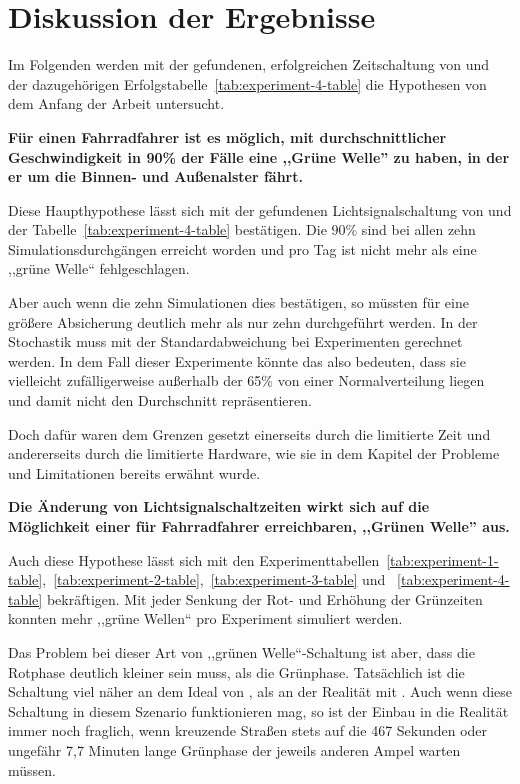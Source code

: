 %


\section{Diskussion der Ergebnisse}\label{sec:discussion-of-results}

Im Folgenden werden mit der gefundenen, erfolgreichen Zeitschaltung von  und der dazugehörigen Erfolgstabelle~\ref{tab:experiment-4-table} die Hypothesen von dem Anfang der Arbeit untersucht.

\textbf{Für einen Fahrradfahrer ist es möglich, mit durchschnittlicher Geschwindigkeit in 90\% der Fälle eine ,,Grüne Welle'' zu haben, in der er um die Binnen- und Außenalster fährt.}

Diese Haupthypothese lässt sich mit der gefundenen Lichtsignalschaltung von  und der Tabelle~\ref{tab:experiment-4-table} bestätigen.
Die 90\% sind bei allen zehn Simulationsdurchgängen erreicht worden und pro Tag ist nicht mehr als eine ,,grüne Welle`` fehlgeschlagen.

Aber auch wenn die zehn Simulationen dies bestätigen, so müssten für eine größere Absicherung deutlich mehr als nur zehn durchgeführt werden.
In der Stochastik muss mit der Standardabweichung bei Experimenten gerechnet werden.
In dem Fall dieser Experimente könnte das also bedeuten, dass sie vielleicht zufälligerweise außerhalb der 65\% von einer Normalverteilung liegen und damit nicht den Durchschnitt repräsentieren.

Doch dafür waren dem Grenzen gesetzt einerseits durch die limitierte Zeit und andererseits durch die limitierte Hardware, wie sie in dem Kapitel der Probleme und Limitationen bereits erwähnt wurde.

\textbf{Die Änderung von Lichtsignalschaltzeiten wirkt sich auf die Möglichkeit einer für Fahrradfahrer erreichbaren, ,,Grünen Welle'' aus.}

Auch diese Hypothese lässt sich mit den Experimenttabellen~\ref{tab:experiment-1-table},~\ref{tab:experiment-2-table},~\ref{tab:experiment-3-table} und ~\ref{tab:experiment-4-table} bekräftigen.
Mit jeder Senkung der Rot- und Erhöhung der Grünzeiten konnten mehr ,,grüne Wellen`` pro Experiment simuliert werden.

Das Problem bei dieser Art von ,,grünen Welle``-Schaltung ist aber, dass die Rotphase deutlich kleiner sein muss, als die Grünphase.
Tatsächlich ist die Schaltung  viel näher an dem Ideal von , als an der Realität mit .
Auch wenn diese Schaltung in diesem Szenario funktionieren mag, so ist der Einbau in die Realität immer noch fraglich, wenn kreuzende Straßen stets auf die 467 Sekunden oder ungefähr 7,7 Minuten lange Grünphase der jeweils anderen Ampel warten müssen.

